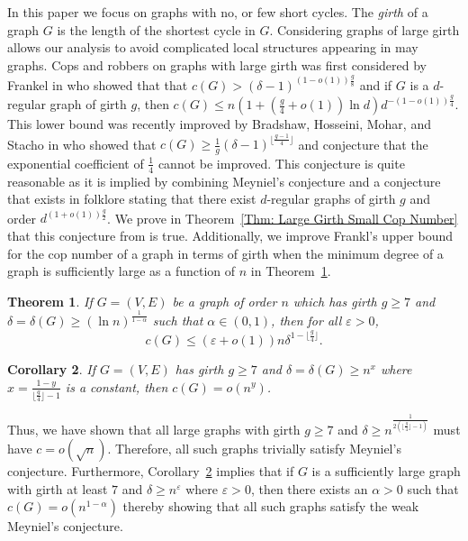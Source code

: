 \documentclass{amsart}
\newtheorem{theorem}{Theorem}[section]
\newtheorem{corollary}[theorem]{Corollary}
\theoremstyle{definition}
\def\epsilon{\varepsilon}
\begin{document}
In this paper we focus on graphs with no, or few short cycles. The \emph{girth} of a graph $G$ is the length of the shortest cycle in $G$.  Considering graphs of large girth allows our analysis to avoid complicated local structures appearing in may graphs. Cops and robbers on graphs with large girth was first considered by Frankel in \cite{frankl1987cops} who showed that that $c(G) > (\delta-1)^{(1-o(1))\frac{g}{8}}$ and if $G$ is a $d$-regular graph of girth $g$, then $c(G) \leq n (1+(\frac{g}{4} +o(1)) \ln{d}) d^{-(1-o(1))\frac{g}{4}}$. This lower bound was recently improved by Bradshaw, Hosseini, Mohar, and Stacho in \cite{bradshaw2023cop} who showed that $c(G) \geq \frac{1}{g} (\delta - 1)^{\lfloor \frac{g-1}{4}\rfloor}$ and conjecture that the exponential coefficient of $\frac{1}{4}$ cannot be improved. This conjecture is quite reasonable as it is implied by combining Meyniel's conjecture and a conjecture that exists in folklore stating that there exist $d$-regular graphs of girth $g$ and order $d^{(1+o(1))\frac{g}{2}}$. We prove in Theorem~\ref{Thm: Large Girth Small Cop Number} that this conjecture from \cite{bradshaw2023cop} is true. Additionally, we improve Frankl's upper bound for the cop number of a graph in terms of girth when the minimum degree of a graph is sufficiently large as a function of $n$ in Theorem~\ref{Thm: Cop Number Upper Bound}.


\begin{theorem}\label{Thm: Cop Number Upper Bound}
If $G = (V,E)$ be a graph of order $n$ which has girth $g \geq 7$ and $\delta = \delta(G) \geq (\ln{n})^{\frac{1}{1-\alpha}}$ such that $\alpha \in (0,1)$, then for all $\epsilon>0$, 
\[
c(G) \leq (\epsilon + o(1))n \delta^{1 - \lfloor \frac{g}{4} \rfloor}.
\]
\end{theorem}


\begin{corollary}\label{Corollary: Meyniel's Conjecutre Implication}
If $G = (V,E)$ has girth $g \geq 7$ and $\delta = \delta(G) \geq n^{x}$ where $x = \frac{1-y}{\lfloor \frac{g}{4} \rfloor - 1}$ is a constant, then $c(G) = o(n^{y})$. 
\end{corollary}


Thus, we have shown that all large graphs with girth $g \geq 7$ and $\delta \geq n^{\frac{1}{2(\lfloor \frac{g}{4} \rfloor - 1)}}$ must have $c = o(\sqrt{n})$. Therefore, all such graphs trivially satisfy Meyniel's conjecture. Furthermore, Corollary~\ref{Corollary: Meyniel's Conjecutre Implication} implies that if $G$ is a sufficiently large graph with girth at least $7$ and $\delta \geq n^{\epsilon}$ where $\epsilon>0$, then there exists an $\alpha>0$ such that $c(G) = o(n^{1-\alpha})$ thereby showing that all such graphs satisfy the weak Meyniel's conjecture. 
\end{document}
